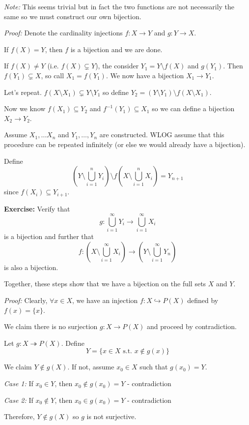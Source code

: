 \documentclass[12pt]{report}
\newcommand{\sub}{\subseteq}
\newcommand{\st}{\text{ s.t. }}
\newcommand{\card}{\text{card }}
\newcommand{\inj}{\hookrightarrow}
\newenvironment*{tbox}[2][gray]{
    \begin{tcolorbox}[
        parbox=false,
        colback=#1!5!white,
        colframe=#1!75!black,
        breakable,
        title={#2}
    ]}
    {\end{tcolorbox}}
\newenvironment*{exercise}[1][red]{
    \begin{tcolorbox}[
        parbox=false,
        colback=#1!5!white,
        colframe=#1!75!black,
        breakable
    ]}
    {\end{tcolorbox}}
\begin{document}
    \begin{tbox}{\textbf{Schröder-Bernstein Theorem:} If $\card X \leq \card Y$ and $\card Y \leq \card X$, then $\card X = \card Y$}
        \emph{Note:} This seems trivial but in fact the two functions are not necessarily the same so we must construct our own bijection. 

        \emph{Proof:} Denote the cardinality injections $f: X \to Y$ and $g: Y \to X$.

        If $f(X) = Y$, then $f$ is a bijection and we are done.

        If $f(X) \neq Y$ (i.e. $f(X) \subsetneq Y$), the consider $Y_1 = Y \setminus f(X)$ and $g(Y_1)$. Then $f(Y_1) \subsetneq X$, so call $X_1 = f(Y_1)$. We now have a bijection $X_1 \to Y_1$. 

        Let's repeat. $f(X \setminus X_1) \subsetneq Y \setminus Y_1$ so define $Y_2 = (Y \setminus Y_1) \setminus f(X \setminus X_1)$.

        Now we know $f(X_1) \sub Y_2$ and $f^{-1}(Y_1) \sub X_1$ so we can define a bijection $X_2 \to Y_2$.

        Assume $X_1, \dots X_n$ and $Y_1, \dots, Y_n$ are constructed. WLOG assume that this procedure can be repeated infinitely (or else we would already have a bijection). 

        Define 
        \[\left(Y \setminus \bigcup_{i=1}^n Y_i\right) \setminus f\left(X \setminus \bigcup_{i=1}^n X_i\right) = Y_{n+1}\]
        since $f(X_i) \sub Y_{i+1}$. 

        \begin{exercise}
            \textbf{Exercise:} Verify that 
            \[g: \bigcup_{i=1}^{\infty} Y_i \to \bigcup_{i=1}^{\infty} X_i\]
            is a bijection and further that 
            \[f: \left(X \setminus \bigcup_{i=1}^{\infty} X_i\right) \to \left(Y \setminus \bigcup_{i=1}^{\infty} Y_n\right)\] 
            is also a bijection.
        \end{exercise} 

        Together, these steps show that we have a bijection on the full sets $X$ and $Y$.
    \end{tbox}

    \begin{tbox}{\textbf{Proposition}: For any set $X$, $\card X < \card P(X)$}
        \emph{Proof:} Clearly, $\forall x \in X$, we have an injection $f: X \inj P(X)$ defined by $f(x) = \{x\}$.

        We claim there is no surjection $g: X \to P(X)$ and proceed by contradiction. 

        Let $g: X \twoheadrightarrow P(X)$. Define 
        \[Y = \{x \in X \st x \notin g(x)\}\] 

        We claim $Y \notin g(X)$. If not, assume $x_0 \in X$ such that $g(x_0) = Y$. 

        \emph{Case 1:} If $x_0 \in Y$, then $x_0 \notin g(x_0) = Y$ - contradiction 

        \emph{Case 2:} If $x_0 \notin Y$, then $x_0 \in g(x_0) = Y$ - contradiction

        Therefore, $Y \notin g(X)$ so $g$ is not surjective.
    \end{tbox}
\end{document}
